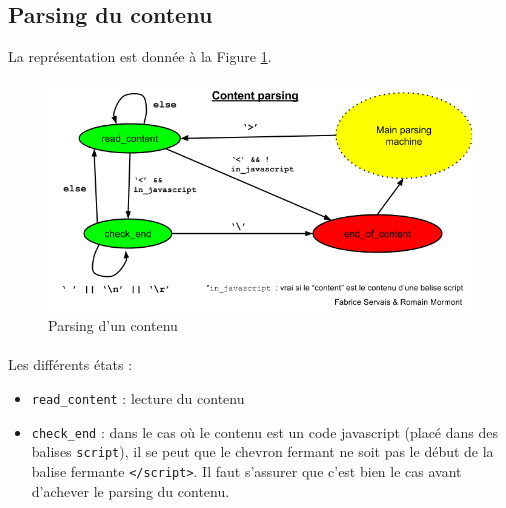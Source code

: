 \documentclass[a4paper,11pt]{article}
\begin{document}
\subsection{Parsing du contenu}
La représentation est donnée à la Figure \ref{fig:pars_content}.
\begin{figure}
	\center
	\includegraphics[scale=0.5]{parseContentFSM.png}
	\caption{Parsing d'un contenu}
	\label{fig:pars_content}
\end{figure}
\paragraph{}
Les différents états :
\begin{itemize}
	\item \texttt{read\_content} : lecture du contenu
	\item \texttt{check\_end} : dans le cas où le contenu est un code javascript (placé dans des balises \texttt{script}), il se peut que le chevron fermant ne soit pas le début de la balise fermante \texttt{</script>}. Il faut s'assurer que c'est bien le cas avant d'achever le parsing du contenu.
\end{itemize}
\end{document}
